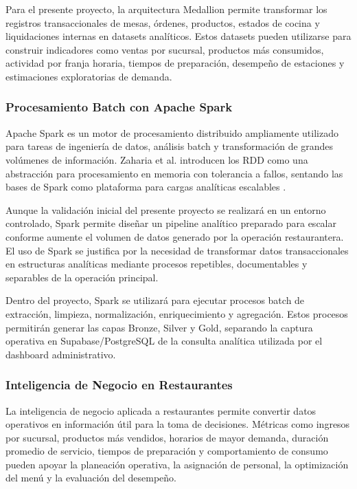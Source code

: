 Para el presente proyecto, la arquitectura Medallion permite transformar los registros
transaccionales de mesas, \'ordenes, productos, estados de cocina y liquidaciones internas
en datasets anal\'iticos. Estos datasets pueden utilizarse para construir indicadores como
ventas por sucursal, productos m\'as consumidos, actividad por franja horaria, tiempos de
preparaci\'on, desempe\~no de estaciones y estimaciones exploratorias de demanda.

\subsubsection{Procesamiento Batch con Apache Spark}

Apache Spark es un motor de procesamiento distribuido ampliamente utilizado para tareas
de ingenier\'ia de datos, an\'alisis batch y transformaci\'on de grandes vol\'umenes de
informaci\'on. Zaharia et al. introducen los RDD como una abstracci\'on para procesamiento
en memoria con tolerancia a fallos, sentando las bases de Spark como plataforma para
cargas anal\'iticas escalables \cite{zaharia2012resilient}.

Aunque la validaci\'on inicial del presente proyecto se realizar\'a en un entorno controlado,
Spark permite dise\~nar un pipeline anal\'itico preparado para escalar conforme aumente el
volumen de datos generado por la operaci\'on restaurantera. El uso de Spark se justifica
por la necesidad de transformar datos transaccionales en estructuras anal\'iticas mediante
procesos repetibles, documentables y separables de la operaci\'on principal.

Dentro del proyecto, Spark se utilizar\'a para ejecutar procesos batch de extracci\'on,
limpieza, normalizaci\'on, enriquecimiento y agregaci\'on. Estos procesos permitir\'an generar
las capas Bronze, Silver y Gold, separando la captura operativa en Supabase/PostgreSQL de
la consulta anal\'itica utilizada por el dashboard administrativo.

\subsubsection{Inteligencia de Negocio en Restaurantes}

La inteligencia de negocio aplicada a restaurantes permite convertir datos operativos en
informaci\'on \'util para la toma de decisiones. M\'etricas como ingresos por sucursal,
productos m\'as vendidos, horarios de mayor demanda, duraci\'on promedio de servicio,
tiempos de preparaci\'on y comportamiento de consumo pueden apoyar la planeaci\'on operativa,
la asignaci\'on de personal, la optimizaci\'on del men\'u y la evaluaci\'on del desempe\~no.

